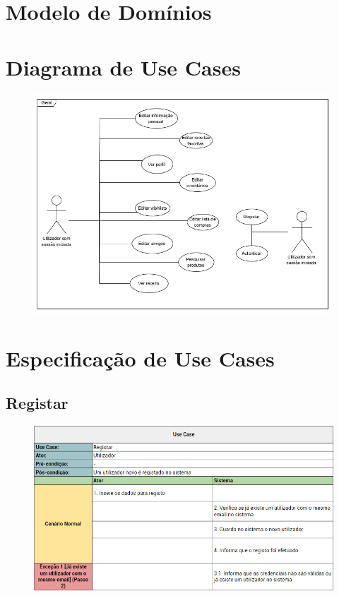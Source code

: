 \documentclass[a4paper]{report}
\begin{document}
\chapter{Modelo de Domínios}

\chapter{Diagrama de Use Cases}
    \begin{figure}[H]
    \centering
        \includegraphics[width=\textwidth]{images/diagrama_use_cases.png}
    \end{figure}

\chapter{Especificação de Use Cases}
    \section{Registar}
        \begin{figure}[H]
        \centering
            \includegraphics[width=\textwidth]{images/usecases/registar.png}
        \end{figure}
\end{document}
